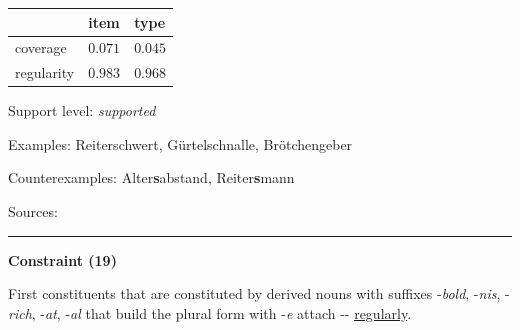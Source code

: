 \vspace{-0.35em}

\begin{table}[!ht]
\begin{center}

\begin{tabularx}{\columnwidth}{|X|X|X|}
\hline
 & item & type \\
\hline
 coverage & $0.071$ & $0.045$ \\
\hline
 regularity & $0.983$ & $0.968$ \\
\hline
\end{tabularx}
\end{center}
\end{table}

\vspace{-1.35em}

\noindent
Support level: \textit{supported}

\vspace{0.3em}

\noindent
Examples: Reiter{\zeroLinker}schwert, Gürtel{\zeroLinker}schnalle, Brötchen{\zeroLinker}geber

\noindent
Counterexamples: Alter\textbf{s}abstand, Reiter\textbf{s}mann

\vspace{0.3em}

\noindent
Sources: \citet[56, 82, 106]{ortner_mueller-bollhagen_1991}


\hrule




\vspace{0.4em}

\begin{center}
\textbf{Constraint (19)}
\end{center}

\noindent
First constituents that are constituted by derived nouns with suffixes -\textit{bold}, -\textit{nis}, -\textit{rich}, -\textit{at}, -\textit{al} that build the plural form with -\textit{e} attach \mbox{-{\zeroLinker}-} \underline{regularly}.
\vspace{0.35em}


